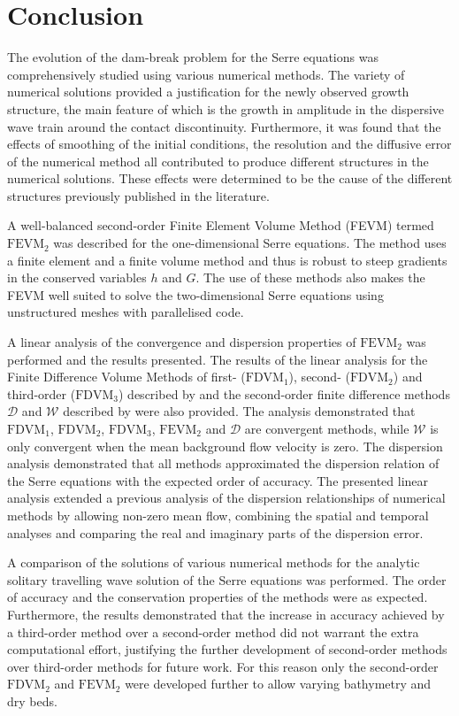 
\chapter{Conclusion}
\label{chp:Conclusion}
The evolution of the dam-break problem for the Serre equations was comprehensively studied using various numerical methods. The variety of numerical solutions provided a justification for the newly observed growth structure, the main feature of which is the growth in amplitude in the dispersive wave train around the contact discontinuity. Furthermore, it was found that the effects of smoothing of the initial conditions, the resolution and the diffusive error of the numerical method all contributed to produce different structures in the numerical solutions. These effects were determined to be the cause of the different structures previously published in the literature. 

A well-balanced second-order Finite Element Volume Method (FEVM) termed $\text{FEVM}_2$ was described for the one-dimensional Serre equations. The method uses a finite element and a finite volume method and thus is robust to steep gradients in the conserved variables $h$ and $G$. The use of these methods also makes the FEVM well suited to solve the two-dimensional Serre equations using unstructured meshes with parallelised code. 

A linear analysis of the convergence and dispersion properties of $\text{FEVM}_2$ was performed and the results presented. The results of the linear analysis for the Finite Difference Volume Methods of first- ($\text{FDVM}_1$), second- ($\text{FDVM}_2$) and third-order ($\text{FDVM}_3$) described by \citet{Zoppou-etal-2017} and the second-order finite difference methods $\mathcal{D}$ and $\mathcal{W}$ described by \citet{Pitt-2018-61} were also provided. The analysis demonstrated that $\text{FDVM}_1$, $\text{FDVM}_2$, $\text{FDVM}_3$, $\text{FEVM}_2$ and $\mathcal{D}$ are convergent methods, while $\mathcal{W}$ is only convergent when the mean background flow velocity is zero. The dispersion analysis demonstrated that all methods approximated the dispersion relation of the Serre equations with the expected order of accuracy. The presented linear analysis extended a previous analysis of the dispersion relationships of numerical methods \cite{Filippini-etal-2016-381} by allowing non-zero mean flow, combining the spatial and temporal analyses and comparing the real and imaginary parts of the dispersion error. 

A comparison of the solutions of various numerical methods for the analytic solitary travelling wave solution of the Serre equations was performed. The order of accuracy and the conservation properties of the methods were as expected. Furthermore, the results demonstrated that the increase in accuracy achieved by a third-order method over a second-order method did not warrant the extra computational effort, justifying the further development of second-order methods over third-order methods for future work. For this reason only the second-order $\text{FDVM}_2$ and $\text{FEVM}_2$ were developed further to allow varying bathymetry and dry beds.

